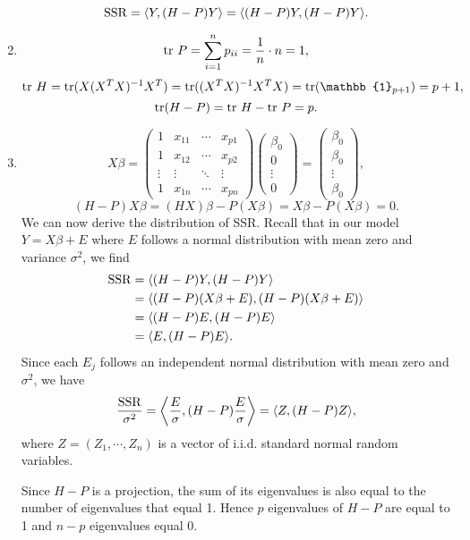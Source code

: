 \documentclass[11pt,a4paper]{article}
\begin{document}
\begin{enumerate}[label=\roman*)]
$${\rm SSR}=\langle Y,(H-P)Y\rangle=\langle (H-P)Y,(H-P)Y\rangle.$$
\item
$${\rm tr\ }P=\sum_{i=1}^np_{ii}=\frac{1}{n}\cdot n=1,$$
$${\rm tr\ }H={\rm tr}(X(X^TX)^{-1}X^T)={\rm tr}((X^TX)^{-1}X^TX)={\rm tr}(\mathbb{1}_{p+1})=p+1,$$
$${\rm tr}(H-P)={\rm tr\ }H-{\rm tr\ }P=p.$$
\item
$$X\beta=\begin{pmatrix}
1 & x_{11} & \cdots & x_{p1} \\
1 & x_{12} & \cdots & x_{p2} \\
\vdots & \vdots & \ddots & \vdots \\ 
1 & x_{1n} & \cdots & x_{pn}
\end{pmatrix}\begin{pmatrix}
\beta_0 \\ 0 \\ \vdots \\ 0
\end{pmatrix}=\begin{pmatrix}
\beta_0 \\ \beta_0 \\ \vdots \\ \beta_0
\end{pmatrix},$$
$$(H-P)X\beta=(HX)\beta-P(X\beta)=X\beta-P(X\beta)=0.$$
We can now derive the distribution of SSR. Recall that in our model $Y=X\beta+E$ where $E$ follows a normal distribution with mean zero and variance $\sigma^2$, we find 
\begin{align*}
{\rm SSR}&=\langle (H-P)Y,(H-P)Y\rangle \\
&=\langle (H-P)(X\beta+E),(H-P)(X\beta+E)\rangle\\
&=\langle (H-P)E,(H-P)E\rangle\\
&=\langle E,(H-P)E\rangle.
\end{align*}
Since each $E_j$ follows an independent normal distribution with mean zero and $\sigma^2$, we have
$$\frac{\rm SSR}{\sigma^2}=\left\langle\frac{E}{\sigma},(H-P)\frac{E}{\sigma}\right\rangle=\langle Z,(H-P)Z\rangle,$$
where $Z = (Z_1 , \cdots , Z_n )$ is a vector of i.i.d. standard normal random variables.\medskip

Since $H-P$ is a projection, the sum of its eigenvalues is also equal to the number of eigenvalues that equal 1. Hence $p$ eigenvalues of $H-P$ are equal to 1 and $n-p$  eigenvalues equal 0.\medskip


\end{enumerate}
\end{document}
